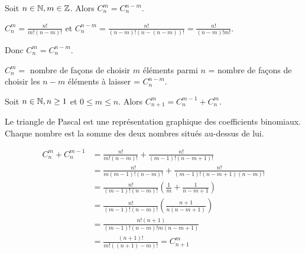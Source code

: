 \documentclass[a4paper, 12pt]{article}
\begin{document}
\begin{proposition}
    Soit $n \in \mathbb{N}, m \in \mathbb{Z}$. Alors $C^m_n = C^{n-m}_n$.
\end{proposition}

\begin{demonstration}[1]
    $C^m_n = \frac{n!}{m!(n-m)!}$ et $C^{n-m}_n = \frac{n!}{(n-m)!(n-(n-m))!} = \frac{n!}{(n-m)!m!}$.

    Donc $C^m_n = C^{n-m}_n$.
\end{demonstration}

\begin{demonstration}[2]
    $C^m_n =$ nombre de façons de choisir $m$ éléments parmi $n$ = nombre de façons de choisir les $n - m$ éléments à laisser = $C^{n-m}_n$.
\end{demonstration}

\begin{proposition}
    Soit $n \in \mathbb{N}, n \geq 1$ et $0 \leq m \leq n$.
    Alors $C^m_{n+1} = C^{m-1}_{n} + C^m_{n}$. 
\end{proposition}

\begin{remark}
    Le triangle de Pascal est une représentation graphique des coefficients binomiaux. Chaque nombre est la somme des deux nombres situés au-dessus de lui.
    \begin{center}
    \end{center}
\end{remark}

\begin{demonstration}[1]
    \begin{align*}    
        C^m_n + C^{m - 1}_n &= \frac{n!}{m!(n-m)!} + \frac{n!}{(m-1)!(n-m+1)!} \\
        &= \frac{n!}{m(m - 1)!(n - m)!} + \frac{n!}{(m - 1)!(n - m + 1)(n - m)!} \\
        &= \frac{n!}{(m - 1)!(n - m)!} \left( \frac{1}{m} + \frac{1}{n - m + 1} \right) \\
        &= \frac{n!}{(m - 1)!(n - m)!} \left( \frac{n + 1}{n(n - m + 1)} \right) \\
        &= \frac{n!(n+1)}{(m - 1)!(n - m)!m(n - m + 1)} \\
        &= \frac{(n + 1)!}{m!((n + 1) - m)!} = C^m_{n+1}
    \end{align*}
\end{demonstration}
\end{document}
